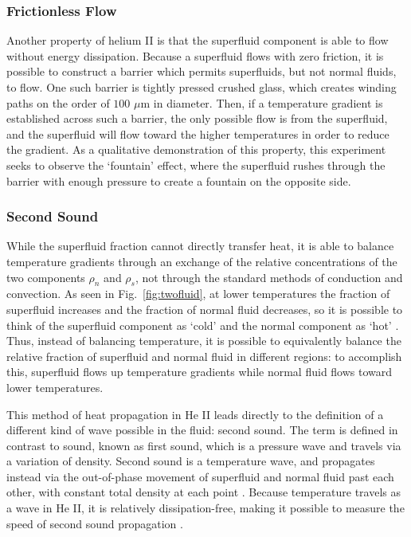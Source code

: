\subsubsection{Frictionless Flow}\label{frictionlessflow}
Another property of helium II is that the superfluid component is able
to flow without energy dissipation. Because a superfluid flows with
zero friction, it is possible to construct a barrier which permits
superfluids, but not normal fluids, to flow. One such barrier is
tightly pressed crushed glass, which creates winding paths on the
order of $100$ $\mu$m in diameter. Then, if a temperature gradient is
established across such a barrier, the only possible flow is from the
superfluid, and the superfluid will flow toward the higher
temperatures in order to reduce the gradient. As a qualitative
demonstration of this property, this experiment seeks to observe the
`fountain' effect, where the superfluid rushes through the barrier
with enough pressure to create a fountain on the opposite side.

\subsubsection{Second Sound}\label{secondsound}
While the superfluid fraction cannot directly transfer heat, it
is able to balance temperature gradients through an exchange of the
relative concentrations of the two components $\rho_n$ and
$\rho_s$, not through the standard methods of conduction and convection. As seen in Fig.~\ref{fig:twofluid}, at lower temperatures the
fraction of superfluid increases and the fraction of normal fluid
decreases, so it is possible to think of the superfluid component as
`cold' and the normal component as `hot' \cite{atkins}. Thus, instead
of balancing temperature, it is possible to equivalently balance the
relative fraction of superfluid and normal fluid in different regions:
to accomplish this, superfluid flows up temperature gradients while
normal fluid flows toward lower temperatures.

This method of heat propagation in He II leads directly to the
definition of a different kind of wave possible in the fluid: second
sound. The term is defined in contrast to sound, known as first sound,
which is a pressure wave and travels via a variation of
density. Second sound is a temperature wave, and propagates instead
via the out-of-phase movement of superfluid and normal fluid past each
other, with constant total density at each point
\cite{atkins}. Because temperature travels as a wave in He II, it is
relatively dissipation-free, making it possible to measure the speed
of second sound propagation \cite{atkins}.

